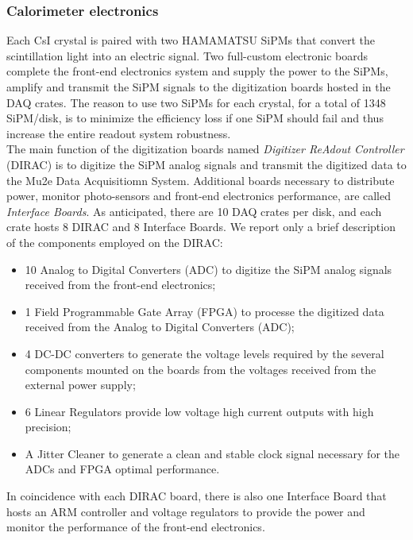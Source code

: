 \documentclass[12pt,a4paper,openright, oneside, titlepage]{book} %
\begin{document}
\subsubsection{Calorimeter electronics}
Each CsI crystal is paired with two HAMAMATSU SiPMs that convert the scintillation light into an electric signal. 
Two full-custom electronic boards complete the front-end electronics system and supply the power to the SiPMs, amplify and transmit the SiPM signals to the digitization boards hosted in the DAQ crates. 
The reason to use two SiPMs for each crystal, for a total of 1348 SiPM/disk, is to minimize the efficiency loss if one SiPM should fail and thus increase the entire readout
system robustness.\\ 
The main function of the digitization boards named  \textit{Digitizer ReAdout Controller} (DIRAC) is to digitize the SiPM analog signals and transmit the digitized data to the Mu2e Data Acquisitiomn System.
Additional boards necessary to distribute power, monitor photo-sensors and front-end electronics  performance, are called \textit{Interface Boards}. 
As anticipated, there are 10 DAQ crates per disk, and each crate hosts 8 DIRAC and 8 Interface Boards. 
We report only a brief description of the components employed on the DIRAC:
\begin{itemize}
\item 10 Analog to Digital Converters (ADC) to  digitize the SiPM analog signals received from the front-end electronics;
\item 1 Field Programmable Gate Array (FPGA) to processe the digitized data received from  the Analog to Digital Converters (ADC);
\item 4 DC-DC converters to generate the voltage levels required by the several components mounted on the boards from the voltages received from the external power supply; 
\item 6 Linear Regulators provide low voltage high current outputs with high precision;
\item A Jitter Cleaner to generate a clean and stable clock signal necessary for the ADCs and FPGA optimal performance.
\end{itemize}
In coincidence with each DIRAC board, there is also one Interface Board that hosts an ARM controller and voltage regulators to provide the power and monitor the performance of the front-end electronics.
\end{document}
